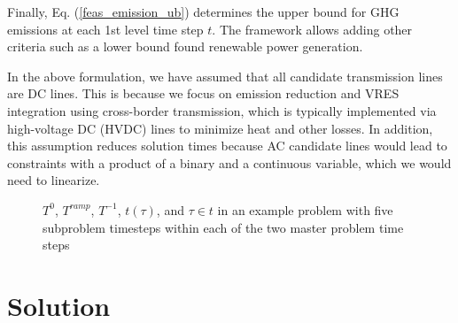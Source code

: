 \documentclass[final]{IEEEtran}
\begin{document}
Finally, Eq. (\ref{feas_emission_ub}) determines the upper bound for GHG emissions at each 1st level time step $t$. The framework allows adding other criteria such as a lower bound found renewable power generation.

In the above formulation, we have assumed that all candidate transmission lines are DC lines. This is because we focus on emission reduction and VRES integration using cross-border transmission, which is typically implemented via high-voltage DC (HVDC) lines to minimize heat and other losses. In addition, this assumption reduces solution times because AC candidate lines would lead to constraints with a product of a binary and a continuous variable, which we would need to linearize.

\begin{figure}[htpb]
	\caption{$T^0$, $T^{ramp}$, $T^{-1}$, $t(\tau)$, and $\tau \in t$ in an example problem with five subproblem timesteps within each of the two master problem time steps}
	\label{fig_time_scales}
\end{figure}

\section{Solution}
\end{document}

